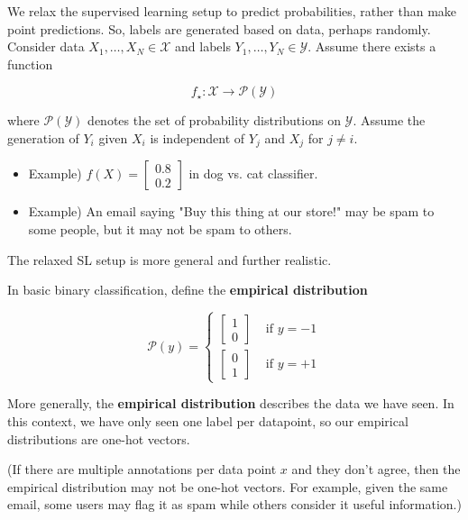 \documentclass{report}
\begin{document}
\begin{concept}
    We relax the supervised learning setup to predict probabilities, rather than make point predictions.
    So, labels are generated based on data, perhaps randomly.
    Consider data $X_{1}, \ldots, X_{N} \in \mathcal{X}$ and labels $Y_{1}, \ldots, Y_{N} \in \mathcal{Y}$. Assume there exists a function

    $$
    f_{\star}: \mathcal{X} \rightarrow \mathcal{P}(\mathcal{Y})
    $$

    where $\mathcal{P}(\mathcal{Y})$ denotes the set of probability distributions on $\mathcal{Y}$.
    Assume the generation of $Y_{i}$ given $X_{i}$ is independent of $Y_{j}$ and $X_{j}$ for $j \neq i$.

    \begin{itemize}
        \item Example) $f(X)=\left[\begin{array}{l}0.8 \\ 0.2\end{array}\right]$ in dog vs. cat classifier.
        \item Example) An email saying "Buy this thing at our store!" may be spam to some people, but it may not be spam to others.
    \end{itemize}

    The relaxed SL setup is more general and further realistic.
\end{concept}

\begin{definition}
    In basic binary classification, define the \textbf{empirical distribution}

    $$
    \mathcal{P}(y)= \begin{cases}{\left[\begin{array}{l}
    1 \\
    0
    \end{array}\right]} & \text { if } y=-1 \\
    {\left[\begin{array}{l}
    0 \\
    1
    \end{array}\right]} & \text { if } y=+1\end{cases}
    $$

    More generally, the \textbf{empirical distribution} describes the data we have seen.
    In this context, we have only seen one label per datapoint, so our empirical distributions are one-hot vectors.

    (If there are multiple annotations per data point $x$ and they don't agree, then the empirical distribution may not be one-hot vectors.
    For example, given the same email, some users may flag it as spam while others consider it useful information.)
\end{definition}
\end{document}
